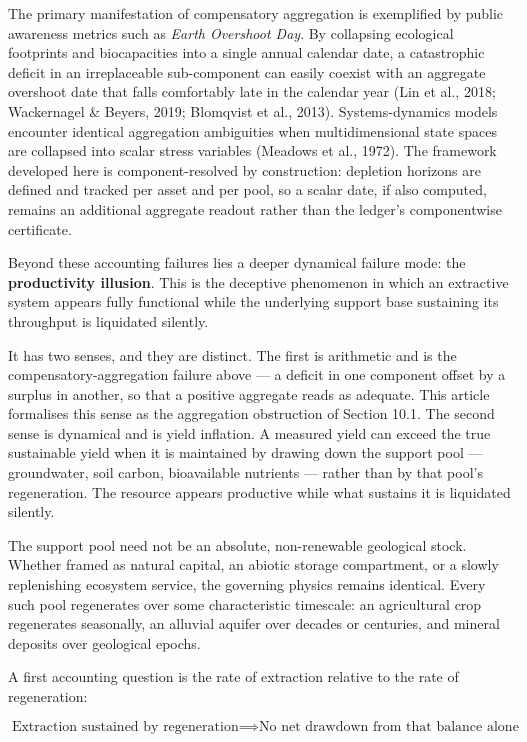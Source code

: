 \documentclass[11pt]{article}
\begin{document}
The primary manifestation of compensatory aggregation is exemplified by public awareness metrics such as \emph{Earth Overshoot Day}. By collapsing ecological footprints and biocapacities into a single annual calendar date, a catastrophic deficit in an irreplaceable sub-component can easily coexist with an aggregate overshoot date that falls comfortably late in the calendar year (Lin et al., 2018; Wackernagel \& Beyers, 2019; Blomqvist et al., 2013). Systems-dynamics models encounter identical aggregation ambiguities when multidimensional state spaces are collapsed into scalar stress variables (Meadows et al., 1972). The framework developed here is component-resolved by construction: depletion horizons are defined and tracked per asset and per pool, so a scalar date, if also computed, remains an additional aggregate readout rather than the ledger's componentwise certificate.

Beyond these accounting failures lies a deeper dynamical failure mode: the \textbf{productivity illusion}. This is the deceptive phenomenon in which an extractive system appears fully functional while the underlying support base sustaining its throughput is liquidated silently.

It has two senses, and they are distinct. The first is arithmetic and is the compensatory-aggregation failure above --- a deficit in one component offset by a surplus in another, so that a positive aggregate reads as adequate. This article formalises this sense as the aggregation obstruction of Section 10.1. The second sense is dynamical and is yield inflation. A measured yield can exceed the true sustainable yield when it is maintained by drawing down the support pool --- groundwater, soil carbon, bioavailable nutrients --- rather than by that pool's regeneration. The resource appears productive while what sustains it is liquidated silently.

The support pool need not be an absolute, non-renewable geological stock. Whether framed as natural capital, an abiotic storage compartment, or a slowly replenishing ecosystem service, the governing physics remains identical. Every such pool regenerates over some characteristic timescale: an agricultural crop regenerates seasonally, an alluvial aquifer over decades or centuries, and mineral deposits over geological epochs.

A first accounting question is the rate of extraction relative to the rate of regeneration:

\[ \text{Extraction sustained by regeneration} \implies \text{No net drawdown from that balance alone} \]
\end{document}
